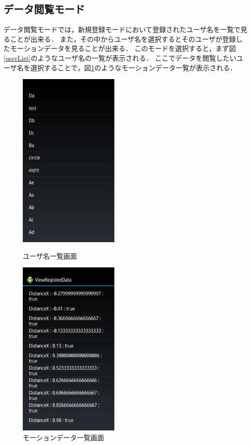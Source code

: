 \documentclass[11pt]{jreport}
\begin{document}
	    \subsection{データ閲覧モード}
	    データ閲覧モードでは，新規登録モードにおいて登録されたユーザ名を一覧で見ることが出来る．
        また，その中からユーザ名を選択するとそのユーザが登録したモーションデータを見ることが出来る．
        このモードを選択すると，まず図\ref{userList}のようなユーザ名の一覧が表示される．
        ここでデータを閲覧したいユーザ名を選択することで，図\ref{dataList}のようなモーションデータ一覧が表示される．

        \begin{figure}[htbp]
            \begin{minipage}{0.5\hsize}
                \begin{center}
                    \includegraphics[width=5cm, bb=0 0 540 960]{UserList.pdf}
                \end{center}
                \caption{ユーザ名一覧画面}
                \label{userList}
            \end{minipage}
            \begin{minipage}{0.5\hsize}
                \begin{center}
                    \includegraphics[width=5cm, bb=0 0 540 960]{DataList.pdf}
                \end{center}
                \caption{モーションデータ一覧画面}
                \label{dataList}
            \end{minipage}
        \end{figure}
\end{document}
